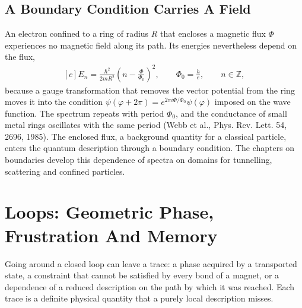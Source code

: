 \documentclass[11pt,oneside]{book}
\newenvironment{centeredalign}{\[\begin{gathered}[c]}{\end{gathered}\]}
\begin{document}
\section{A Boundary Condition Carries A Field}
An electron confined to a ring of radius \(R\) that encloses a magnetic flux \(\Phi\) experiences no magnetic field
along its path. Its energies nevertheless depend on the flux,
\begin{centeredalign}
E_n=\frac{\hbar^2}{2mR^2}\left(n-\frac{\Phi}{\Phi_0}\right)^2,\qquad \Phi_0=\frac{h}{e},\qquad n\in\mathbb Z,
\end{centeredalign}
because a gauge transformation that removes the vector potential from the ring moves it into the condition
\(\psi(\varphi+2\pi)=e^{2\pi i\Phi/\Phi_0}\psi(\varphi)\) imposed on the wave function. The spectrum repeats with
period \(\Phi_0\), and the conductance of small metal rings oscillates with the same period (Webb et al., Phys. Rev.
Lett. 54, 2696, 1985). The enclosed flux, a background quantity for a classical particle, enters the quantum
description through a boundary condition. The chapters on boundaries develop this dependence of spectra on domains for
tunnelling, scattering and confined particles.



\chapter{Loops: Geometric Phase, Frustration And Memory}\label{chap:loops}
\begin{claimbox}
Going around a closed loop can leave a trace: a phase acquired by a transported state, a constraint that cannot be
satisfied by every bond of a magnet, or a dependence of a reduced description on the path by which it was reached.
Each trace is a definite physical quantity that a purely local description misses.
\end{claimbox}
\end{document}
